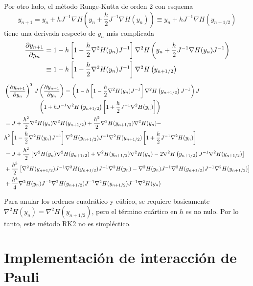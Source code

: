 Por otro lado, el método Runge-Kutta de orden 2 con esquema
\[ y_{n+1} = y_n + h J^{-1} \nabla H\left(y_n + \frac{h}{2} J^{-1} \nabla H(y_n) \right) \equiv y_n + h J^{-1} \nabla H\left(y_{n+1/2} \right) \]
tiene una derivada respecto de $y_n$ más complicada
\begin{align*}
\frac{\partial y_{n+1}}{\partial y_n} &=  1 - h\left[ 1 - \frac{h}{2} \nabla^2 H(y_n)J^{-1} \right]\nabla^2H\left(y_n + \frac{h}{2} J^{-1} \nabla H(y_n)J^{-1} \right) \\
&\equiv 1 - h\left[ 1 - \frac{h}{2} \nabla^2 H(y_n)J^{-1} \right]\nabla^2H\left(y_{n+1/2} \right) 
\end{align*}
\begin{align*}
 &\left( \frac{\partial y_{n+1}}{\partial y_n} \right)^T J \left( \frac{\partial y_{n+1}}{\partial y_n} \right) = \left( 1 - h\left[ 1 - \frac{h}{2} \nabla^2 H(y_n)J^{-1} \right]\nabla^2H\left(y_{n+1/2} \right)J^{-1} \right) J \\
 &\qquad \qquad \qquad \left(1 + hJ^{-1}\nabla^2H\left(y_{n+1/2} \right)\left[ 1 + \frac{h}{2} J^{-1} \nabla^2 H(y_n) \right] \right)\\
 &= J + \frac{h^2}{2} \nabla^2 H(y_n)\nabla^2H(y_{n+1/2}) + \frac{h^2}{2} \nabla^2H(y_{n+1/2})\nabla^2 H(y_n) -\\
 &h^2\left[ 1 - \frac{h}{2} \nabla^2 H(y_n)J^{-1} \right]\nabla^2H(y_{n+1/2}) J^{-1}\nabla^2H(y_{n+1/2})\left[ 1 + \frac{h}{2} J^{-1} \nabla^2 H(y_n) \right] \\
 &= J + \frac{h^2}{2} \left[ \nabla^2 H(y_n)\nabla^2H(y_{n+1/2}) +  \nabla^2H(y_{n+1/2})\nabla^2 H(y_n) - 2\nabla^2H\left(y_{n+1/2} \right) J^{-1}\nabla^2H(y_{n+1/2}) \right] \\
 & + \frac{h^3}{2} \left[ \nabla^2H(y_{n+1/2}) J^{-1}\nabla^2H(y_{n+1/2})J^{-1} \nabla^2 H(y_n) - \nabla^2 H(y_n)J^{-1}\nabla^2H(y_{n+1/2}) J^{-1}\nabla^2H(y_{n+1/2})\right] \\
 & + \frac{h^4}{4} \nabla^2 H(y_n)J^{-1}\nabla^2H(y_{n+1/2}) J^{-1}\nabla^2H(y_{n+1/2})J^{-1}\nabla^2 H(y_n)
\end{align*}

Para anular los ordenes cuadrático y cúbico, se requiere basicamente $\nabla^2H(y_n) = \nabla^2H(y_{n+1/2})$, pero el término cuártico en $h$ es no nulo.
Por lo tanto, este método RK2 no es simpléctico.

\newpage

\section{Implementación de interacción de Pauli}

